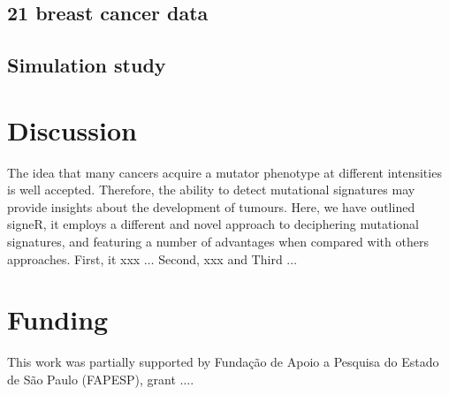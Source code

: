 \documentclass{bioinfo}
\begin{document}
\subsection{21 breast cancer data}
\subsection{Simulation study}

\section{Discussion}
The idea that many cancers acquire a mutator phenotype at different 
intensities is well accepted. Therefore, the ability to detect 
mutational signatures may provide insights about the development of
tumours. Here, we have outlined signeR, it employs a different and 
novel approach to deciphering mutational signatures, and featuring a
number of advantages when compared with others approaches. First, it
xxx $\ldots$ Second, xxx and Third $\ldots$ 

\section*{Funding}
This work was partially supported by Funda\c{c}\~ao de Apoio a Pesquisa
do Estado de S\~ao Paulo (FAPESP), grant $\ldots$. 
\vspace*{-12pt}
 
 

\end{document}
